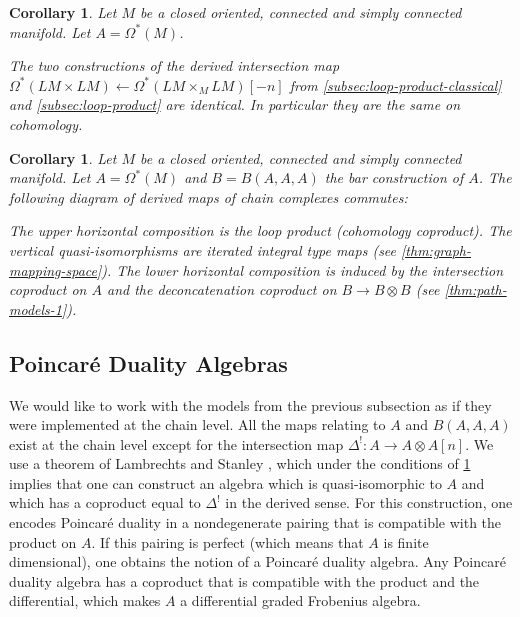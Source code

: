 \documentclass{scrartcl}
\theoremstyle{plain}
\newtheorem{corollary}[theorem]{Corollary}
\theoremstyle{definition}
\newcommand{\quiso}{\simeq}
\newcommand{\from}{\leftarrow}
\DeclareMathOperator{\id}{id}
\begin{document}
\begin{corollary}\label{thm:loop-products-identity}
    Let $M$ be a closed oriented, connected and simply connected manifold. Let $A = \Omega^*(M)$.

    The two constructions of the derived intersection map $\Omega^*(LM\times LM) \from \Omega^{*}(LM\times_M LM)[-n]$ from \cref{subsec:loop-product-classical} and \cref{subsec:loop-product} are identical. In particular they are the same on cohomology.
\end{corollary}

\begin{corollary}\label{thm:loop-product-derived}
    Let $M$ be a closed oriented, connected and simply connected manifold. Let $A = \Omega^*(M)$ and $B=B(A, A, A)$ the bar construction of $A$.
    The following diagram of derived maps of chain complexes commutes:
    \begin{center}
    \end{center}
    The upper horizontal composition is the loop product (cohomology coproduct). The vertical quasi-isomorphisms are iterated integral type maps (see \cref{thm:graph-mapping-space}). The lower horizontal composition is induced by the intersection coproduct on $A$ and the deconcatenation coproduct on $B\to B\otimes B$ (see \cref{thm:path-models-1}).
\end{corollary}

\subsection{Poincaré Duality Algebras}\label{subsec:poincare-algebra}

We would like to work with the models from the previous subsection as if they were implemented at the chain level. All the maps relating to $A$ and $B(A, A, A)$ exist at the chain level except for the intersection map $\Delta^!\colon A\to A\otimes A[n]$. We use a theorem of Lambrechts and Stanley \cite{lambrechts2008poincare}, which under the conditions of \cref{thm:loop-product-derived} implies that one can construct an algebra which is quasi-isomorphic to $A$ and which has a coproduct equal to $\Delta^!$ in the derived sense. For this construction, one encodes Poincaré duality in a nondegenerate pairing that is compatible with the product on $A$. If this pairing is perfect (which means that $A$ is finite dimensional), one obtains the notion of a Poincaré duality algebra. Any Poincaré duality algebra has a coproduct that is compatible with the product and the differential, which makes $A$ a differential graded Frobenius algebra. 
\end{document}
